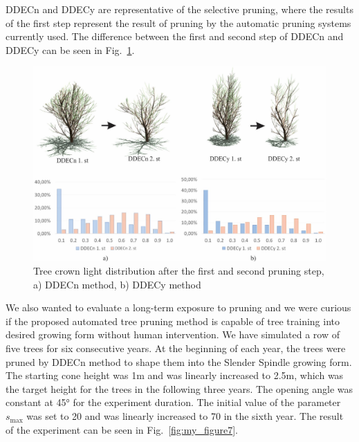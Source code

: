 DDECn and DDECy are representative of the selective pruning, where the
results of the first step represent the result of pruning by the
automatic pruning systems currently used. The difference between the
first and second step of DDECn and DDECy can be seen in Fig.~\ref{fig:my_figure6}.

\begin{figure}[hbt]
    \centering
    \includegraphics[width=5.4in]{figs/image6.jpeg}
    \caption{Tree crown light distribution after the first and
second pruning step, a) DDECn method, b) DDECy method}
    \label{fig:my_figure6}
\end{figure}

We also wanted to evaluate a long-term exposure to pruning and we were
curious if the proposed automated tree pruning method is capable of tree
training into desired growing form without human intervention. We have
simulated a row of five trees for six consecutive years. At the
beginning of each year, the trees were pruned by DDECn method to shape
them into the Slender Spindle growing form. The starting cone height was
1m and was linearly increased to 2.5m, which was the target height for
the trees in the following three years. The opening angle was constant
at 45° for the experiment duration. The initial value of the parameter
\(s_{\mathrm{\max}}\) was set to 20 and was linearly increased to 70 in
the sixth year. The result of the experiment can be seen in Fig.~\ref{fig:my_figure7}.

